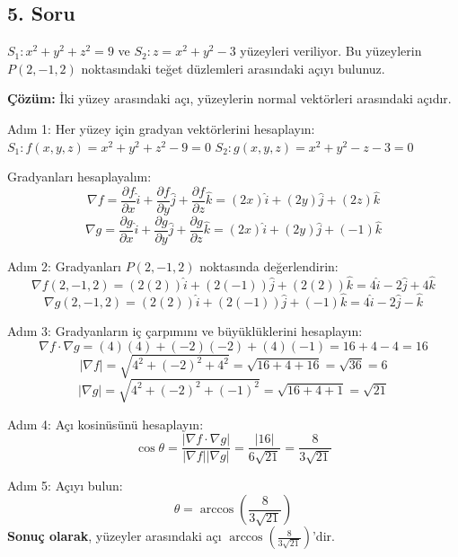 \documentclass[11pt,letterpaper,twocolumn]{fenbil}
\begin{document}
\subsection*{5. Soru}
$S_1: x^2 + y^2 + z^2 = 9$ ve $S_2: z = x^2 + y^2 - 3$ yüzeyleri veriliyor. Bu yüzeylerin $P(2, -1, 2)$ noktasındaki teğet düzlemleri arasındaki açıyı bulunuz.

\textbf{Çözüm:}
İki yüzey arasındaki açı, yüzeylerin normal vektörleri arasındaki açıdır.

Adım 1: Her yüzey için gradyan vektörlerini hesaplayın:
$S_1: f(x, y, z) = x^2 + y^2 + z^2 - 9 = 0$
$S_2: g(x, y, z) = x^2 + y^2 - z - 3 = 0$

Gradyanları hesaplayalım:
\[
\nabla f = \frac{\partial f}{\partial x}\hat{i} + \frac{\partial f}{\partial y}\hat{j} + \frac{\partial f}{\partial z}\hat{k} = (2x)\hat{i} + (2y)\hat{j} + (2z)\hat{k}
\]
\[
\nabla g = \frac{\partial g}{\partial x}\hat{i} + \frac{\partial g}{\partial y}\hat{j} + \frac{\partial g}{\partial z}\hat{k} = (2x)\hat{i} + (2y)\hat{j} + (-1)\hat{k}
\]

Adım 2: Gradyanları $P(2, -1, 2)$ noktasında değerlendirin:
\[
\nabla f(2, -1, 2) = (2(2))\hat{i} + (2(-1))\hat{j} + (2(2))\hat{k} = 4\hat{i} - 2\hat{j} + 4\hat{k}
\]
\[
\nabla g(2, -1, 2) = (2(2))\hat{i} + (2(-1))\hat{j} + (-1)\hat{k} = 4\hat{i} - 2\hat{j} - \hat{k}
\]

Adım 3: Gradyanların iç çarpımını ve büyüklüklerini hesaplayın:
\[
\nabla f \cdot \nabla g = (4)(4) + (-2)(-2) + (4)(-1) = 16 + 4 - 4 = 16
\]
\[
|\nabla f| = \sqrt{4^2 + (-2)^2 + 4^2} = \sqrt{16 + 4 + 16} = \sqrt{36} = 6
\]
\[
|\nabla g| = \sqrt{4^2 + (-2)^2 + (-1)^2} = \sqrt{16 + 4 + 1} = \sqrt{21}
\]

Adım 4: Açı kosinüsünü hesaplayın:
\[
\cos{\theta} = \frac{|\nabla f \cdot \nabla g|}{|\nabla f| |\nabla g|} = \frac{|16|}{6 \sqrt{21}} = \frac{8}{3\sqrt{21}}
\]

Adım 5: Açıyı bulun:
\[
\theta = \arccos{\left(\frac{8}{3\sqrt{21}}\right)}
\]
\textbf{Sonuç olarak}, yüzeyler arasındaki açı $\arccos{\left(\frac{8}{3\sqrt{21}}\right)}$'dir.
\end{document}
